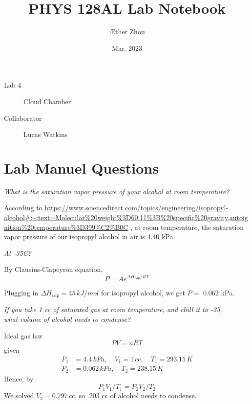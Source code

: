 \documentclass[a4paper]{tufte-handout}
\title{PHYS 128AL Lab Notebook}
\author[]{\AE ther Zhou}
\date{Mar. 2023}
\begin{document}
\maketitle

\begin{projects}
	\begin{description}
        \item [Lab 4] Cloud Chamber 
		\item [Collaborator] Lucas Watkins
		\end{description}
\end{projects}

\tableofcontents

\newpage

\section{Lab Manuel Questions}

\textit{What is the saturation vapor pressure of your alcohol at room temperature?}

According to \url{https://www.sciencedirect.com/topics/engineering/isopropyl-alcohol#:~:text=Molecular\%20weight\%3D60.11\%3B\%20specific\%20gravity,autoignition\%20temperature\%3D399\%C2\%B0C} , at room temperature, the saturation vapor pressure of our isopropyl alcohol in air is 4.40 kPa.

\hrulefill

\textit{At -35C?}

 By Clausius-Clapeyron equation, 
 $$P = Ae^{\Delta H_{vap} / RT}$$

Plugging in $\Delta H_{vap} =  45 \,\si{kJ/mol}$ for isopropyl alcohol, we get $P = $ 0.062 kPa. 

\hrulefill

\textit{If you take 1 cc of saturated gas at room temperature, and chill it to -35,\\ what volume of alcohol needs to condense?}

Ideal gas law 
$$PV = nRT$$
given
\begin{align*}
    P_1 &= 4.4 \,\si{kPa,}\quad V_1 = 1 \,\si{cc,}\quad T_1 = 293.15 \,\si{K}\\
    P_2 &= 0.062 \,\si{kPa,}\quad T_2 = 238.15 \,\si{K}
\end{align*} 
Hence, by
$$P_1 V_1/ T_1 = P_2 V_2/ T_2$$
We solved $V_2 = 0.797 \,\si{cc}$, so $.203$ cc of alcohol needs to condense.
\end{document}
